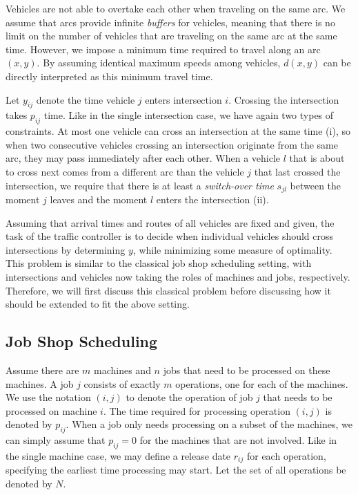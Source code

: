 \documentclass{article}
\theoremstyle{definition}
\theoremstyle{plain}
\begin{document}
Vehicles are not able to overtake each other when traveling on the same arc. We
assume that arcs provide infinite \textit{buffers} for vehicles, meaning that
there is no limit on the number of vehicles that are traveling on the same arc
at the same time. However, we impose a minimum time required to travel along an
arc $(x,y)$. By assuming identical maximum speeds among vehicles, $d(x,y)$ can
be directly interpreted as this minimum travel time.

Let $y_{ij}$ denote the time vehicle $j$ enters intersection $i$. Crossing the
intersection takes $p_{ij}$ time. Like in the single intersection case, we have
again two types of constraints. At most one vehicle can cross an intersection at
the same time (i), so when two consecutive vehicles crossing an intersection
originate from the same arc, they may pass immediately after each other. When a
vehicle $l$ that is about to cross next comes from a different arc than the
vehicle $j$ that last crossed the intersection, we require that there is at
least a \textit{switch-over time} $s_{jl}$ between the moment $j$ leaves and the
moment $l$ enters the intersection (ii).

Assuming that arrival times and routes of all vehicles are fixed and given, the
task of the traffic controller is to decide when individual vehicles should
cross intersections by determining $y$, while minimizing some measure of
optimality. This problem is similar to the classical job shop scheduling
setting, with intersections and vehicles now taking the roles of machines and
jobs, respectively. Therefore, we will first discuss this classical problem
before discussing how it should be extended to fit the above setting.


\subsection{Job Shop Scheduling}

Assume there are $m$ machines and $n$ jobs that need to be processed on these
machines. A job $j$ consists of exactly $m$ operations, one for each of the
machines. We use the notation $(i,j)$ to denote the operation of job $j$ that
needs to be processed on machine $i$. The time required for processing operation
$(i,j)$ is denoted by $p_{ij}$. When a job only needs processing on a subset of
the machines, we can simply assume that $p_{ij} = 0$ for the machines that are
not involved. Like in the single machine case, we may define a release date
$r_{ij}$ for each operation, specifying the earliest time processing may start.
Let the set of all operations be denoted by $N$.
\end{document}
